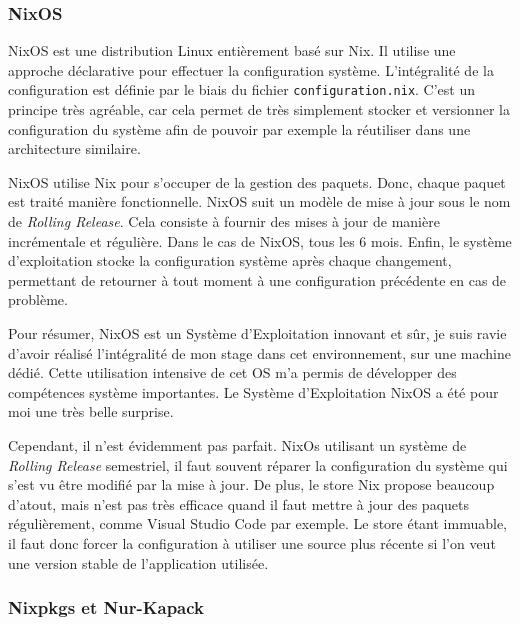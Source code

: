 \documentclass[a4paper,french,12pt, titlepage]{article}
\begin{document}
\hypertarget{nixos}{%
\subsubsection{NixOS}\label{nixos}}

NixOS est une distribution Linux entièrement basé sur Nix. Il utilise
une approche déclarative pour effectuer la configuration système.
L'intégralité de la configuration est définie par le biais du fichier
\texttt{configuration.nix}. C'est un principe très agréable, car cela
permet de très simplement stocker et versionner la configuration du
système afin de pouvoir par exemple la réutiliser dans une architecture
similaire.\newline

NixOS utilise Nix pour s'occuper de la gestion des paquets. Donc, chaque
paquet est traité manière fonctionnelle. NixOS suit un modèle de mise à
jour sous le nom de \emph{Rolling Release}. Cela consiste à fournir des
mises à jour de manière incrémentale et régulière. Dans le cas de NixOS,
tous les 6 mois. Enfin, le système d'exploitation stocke la
configuration système après chaque changement, permettant de retourner à
tout moment à une configuration précédente en cas de problème.\newline

Pour résumer, NixOS est un Système d'Exploitation innovant et sûr, je
suis ravie d'avoir réalisé l'intégralité de mon stage dans cet
environnement, sur une machine dédié. Cette utilisation intensive de cet
OS m'a permis de développer des compétences système importantes. Le
Système d'Exploitation NixOS a été pour moi une très belle
surprise.\newline

Cependant, il n'est évidemment pas parfait. NixOs utilisant un système
de \emph{Rolling Release} semestriel, il faut souvent réparer la
configuration du système qui s'est vu être modifié par la mise à jour.
De plus, le store Nix propose beaucoup d'atout, mais n'est pas très
efficace quand il faut mettre à jour des paquets régulièrement, comme
Visual Studio Code par exemple. Le store étant immuable, il faut donc
forcer la configuration à utiliser une source plus récente si l'on veut
une version stable de l'application utilisée.\newline

\hypertarget{nixpkgs-et-nur-kapack}{%
\subsubsection{Nixpkgs et Nur-Kapack}\label{nixpkgs-et-nur-kapack}}
\end{document}

